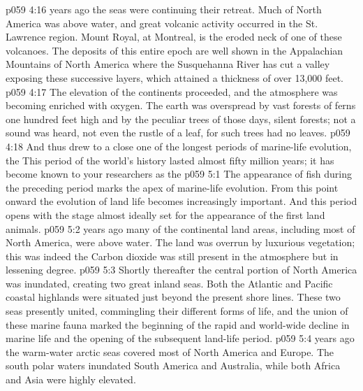 \pc \vs p059 4:16  years ago the seas were continuing their retreat. Much of North America was above water, and great volcanic activity occurred in the St. Lawrence region. Mount Royal, at Montreal, is the eroded neck of one of these volcanoes. The deposits of this entire epoch are well shown in the Appalachian Mountains of North America where the Susquehanna River has cut a valley exposing these successive layers, which attained a thickness of over 13,000 feet.
\pc \vs p059 4:17 The elevation of the continents proceeded, and the atmosphere was becoming enriched with oxygen. The earth was overspread by vast forests of ferns one hundred feet high and by the peculiar trees of those days, silent forests; not a sound was heard, not even the rustle of a leaf, for such trees had no leaves.
\pc \vs p059 4:18 And thus drew to a close one of the longest periods of marine\hyp{}life evolution, the  This period of the world’s history lasted almost fifty million years; it has become known to your researchers as the 
\vs p059 5:1 The appearance of fish during the preceding period marks the apex of marine\hyp{}life evolution. From this point onward the evolution of land life becomes increasingly important. And this period opens with the stage almost ideally set for the appearance of the first land animals.
\pc \vs p059 5:2  years ago many of the continental land areas, including most of North America, were above water. The land was overrun by luxurious vegetation; this was indeed the  Carbon dioxide was still present in the atmosphere but in lessening degree.
\vs p059 5:3 Shortly thereafter the central portion of North America was inundated, creating two great inland seas. Both the Atlantic and Pacific coastal highlands were situated just beyond the present shore lines. These two seas presently united, commingling their different forms of life, and the union of these marine fauna marked the beginning of the rapid and world\hyp{}wide decline in marine life and the opening of the subsequent land\hyp{}life period.
\pc \vs p059 5:4  years ago the warm\hyp{}water arctic seas covered most of North America and Europe. The south polar waters inundated South America and Australia, while both Africa and Asia were highly elevated.
